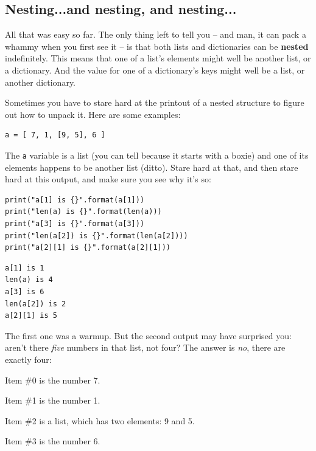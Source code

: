 \subsection{Nesting...and nesting, and nesting...}


All that was easy so far. The only thing left to tell you -- and man, it can
pack a whammy when you first see it -- is that both lists and dictionaries can
be \textbf{nested} indefinitely. This means that one of a list's elements might
well be another list, or a dictionary. And the value for one of a dictionary's
keys might well be a list, or another dictionary.

Sometimes you have to stare hard at the printout of a nested structure to
figure out how to unpack it. Here are some examples:

\begin{Verbatim}[fontsize=\small,samepage=true,frame=single,framesep=3mm]
a = [ 7, 1, [9, 5], 6 ]
\end{Verbatim}


The \texttt{a} variable is a list (you can tell because it starts with a boxie)
and one of its elements happens to be another list (ditto). Stare hard at that,
and then stare hard at this output, and make sure you see why it's so:

\begin{Verbatim}[fontsize=\small,samepage=true,frame=single,framesep=3mm]
print("a[1] is {}".format(a[1]))
print("len(a) is {}".format(len(a)))
print("a[3] is {}".format(a[3]))
print("len(a[2]) is {}".format(len(a[2])))
print("a[2][1] is {}".format(a[2][1]))
\end{Verbatim}
\vspace{-.2in}

\begin{Verbatim}[fontsize=\small,samepage=true,frame=single,framesep=3mm]
a[1] is 1
len(a) is 4
a[3] is 6
len(a[2]) is 2
a[2][1] is 5
\end{Verbatim}

The first one was a warmup. But the second output may have surprised you:
aren't there \textit{five} numbers in that list, not four? The answer is
\textit{no}, there are exactly four:

\begin{compactitem}
\item Item \#0 is the number 7.
\item Item \#1 is the number 1.
\item Item \#2 is a list, which has two elements: 9 and 5.
\item Item \#3 is the number 6.
\end{compactitem}

